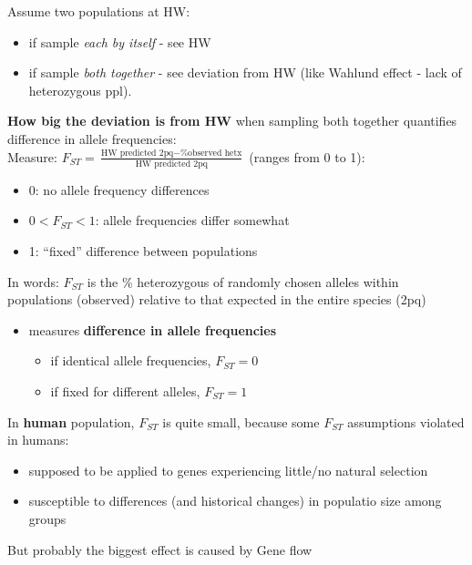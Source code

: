 \documentclass{scrartcl}
\begin{document}
Assume two populations at HW:
\begin{itemize}
\item if sample {\em each by itself} - see HW
\item if sample {\em both together} - see deviation from HW (like Wahlund effect - lack of heterozygous ppl).
\end{itemize}
{\bf How big the deviation is from HW } when sampling both together quantifies difference in allele frequencies:\\
Measure: $F_{ST} = \frac{\text{HW predicted 2pq} - \text{\% observed hetx}}{\text{HW predicted 2pq}}$ (ranges from 0 to 1):
\begin{itemize}
\item 0: no allele frequency differences
\item $0 < F_{ST} < 1$: allele frequencies differ somewhat
\item 1: ``fixed'' difference between populations
\end{itemize}
In words: $F_{ST}$ is the \% heterozygous of randomly chosen alleles within populations (observed) relative to that expected in the entire species (2pq)\\
\begin{itemize}
\item measures {\bf difference in allele frequencies }
  \begin{itemize}
  \item if identical allele frequencies, $F_{ST} = 0$
  \item if fixed for different alleles, $F_{ST} = 1$
  \end{itemize}
\end{itemize}
In {\bf human } population, $F_{ST}$ is quite small, because some $F_{ST}$ assumptions violated in humans:
\begin{itemize}
\item supposed to be applied to genes experiencing little/no natural selection
\item susceptible to differences (and historical changes) in populatio size among groups
\end{itemize}
But probably the biggest effect is caused by Gene flow

\end{document}
